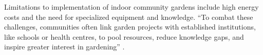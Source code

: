\documentclass{report}
\begin{document}
\hspace{24pt} Limitations to implementation of indoor community gardens include high energy costs and the need for specialized equipment and knowledge. ``To combat these challenges, communities often link garden projects with established institutions, like schools or health centres, to pool resources, reduce knowledge gaps, and inspire greater interest in gardening'' \parencite[90]{resilientcommunities}.

\clearpage

\printbibliography
\end{document}
